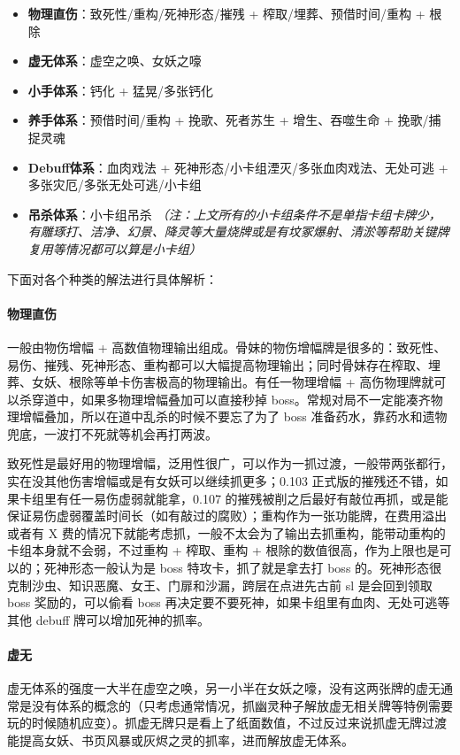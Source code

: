 \documentclass[12pt, a4paper]{article}
\begin{document}
\begin{itemize}
    \item \textbf{物理直伤}：致死性/重构/死神形态/摧残 + 榨取/埋葬、预借时间/重构 + 根除
    \item \textbf{虚无体系}：虚空之唤、女妖之嚎
    \item \textbf{小手体系}：钙化 + 猛晃/多张钙化
    \item \textbf{养手体系}：预借时间/重构 + 挽歌、死者苏生 + 增生、吞噬生命 + 挽歌/捕捉灵魂
    \item \textbf{Debuff体系}：血肉戏法 + 死神形态/小卡组湮灭/多张血肉戏法、无处可逃 + 多张灾厄/多张无处可逃/小卡组
    \item \textbf{吊杀体系}：小卡组吊杀 
    \textit{（注：上文所有的小卡组条件不是单指卡组卡牌少，有雕琢打、洁净、幻景、降灵等大量烧牌或是有坟冢爆射、清淤等帮助关键牌复用等情况都可以算是小卡组）}
\end{itemize}

下面对各个种类的解法进行具体解析：

\paragraph{物理直伤}
一般由物伤增幅 + 高数值物理输出组成。骨妹的物伤增幅牌是很多的：致死性、易伤、摧残、死神形态、重构都可以大幅提高物理输出；同时骨妹存在榨取、埋葬、女妖、根除等单卡伤害极高的物理输出。有任一物理增幅 + 高伤物理牌就可以杀穿道中，如果多物理增幅叠加可以直接秒掉 boss。常规对局不一定能凑齐物理增幅叠加，所以在道中乱杀的时候不要忘了为了 boss 准备药水，靠药水和遗物兜底，一波打不死就等机会再打两波。

致死性是最好用的物理增幅，泛用性很广，可以作为一抓过渡，一般带两张都行，实在没其他伤害增幅或是有女妖可以继续抓更多；0.103 正式版的摧残还不错，如果卡组里有任一易伤虚弱就能拿，0.107 的摧残被削之后最好有敲位再抓，或是能保证易伤虚弱覆盖时间长（如有敲过的腐败）；重构作为一张功能牌，在费用溢出或者有 X 费的情况下就能考虑抓，一般不太会为了输出去抓重构，能带动重构的卡组本身就不会弱，不过重构 + 榨取、重构 + 根除的数值很高，作为上限也是可以的；死神形态一般认为是 boss 特攻卡，抓了就是拿去打 boss 的。死神形态很克制沙虫、知识恶魔、女王、门扉和沙漏，跨层在点进先古前 sl 是会回到领取 boss 奖励的，可以偷看 boss 再决定要不要死神，如果卡组里有血肉、无处可逃等其他 debuff 牌可以增加死神的抓率。

\paragraph{虚无}
虚无体系的强度一大半在虚空之唤，另一小半在女妖之嚎，没有这两张牌的虚无通常是没有体系的概念的（只考虑通常情况，抓幽灵种子解放虚无相关牌等特例需要玩的时候随机应变）。抓虚无牌只是看上了纸面数值，不过反过来说抓虚无牌过渡能提高女妖、书页风暴或灰烬之灵的抓率，进而解放虚无体系。
\end{document}
